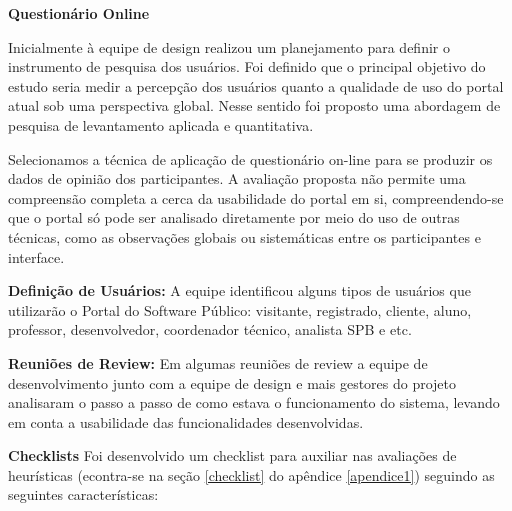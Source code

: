 \textbf{Questionário Online}

Inicialmente à equipe de design realizou um planejamento para definir o instrumento de pesquisa dos usuários. Foi definido que o principal objetivo do estudo seria medir a percepção dos usuários quanto a qualidade de uso do portal atual sob uma perspectiva global. Nesse sentido foi proposto uma abordagem de pesquisa de levantamento aplicada e quantitativa.

Selecionamos a técnica de aplicação de questionário on-line para se produzir os dados de opinião dos participantes. A avaliação proposta não permite uma compreensão completa a cerca da usabilidade do portal em si, compreendendo-se que o portal só pode ser analisado diretamente por meio do uso de outras técnicas, como as observações globais ou sistemáticas entre os participantes e interface.

\textbf{Definição de Usuários:}
	A equipe identificou alguns tipos de usuários que utilizarão o Portal do Software Público: visitante, registrado, cliente, aluno, professor, desenvolvedor, coordenador técnico, analista SPB e etc. 
	
\textbf{Reuniões de Review:}
	Em algumas reuniões de review a equipe de desenvolvimento junto com a equipe de design e mais gestores do projeto analisaram o passo a passo de como estava o funcionamento do sistema, levando em conta a usabilidade das funcionalidades desenvolvidas. 


\textbf{Checklists}
	Foi desenvolvido um checklist para auxiliar nas avaliações de heurísticas (econtra-se na seção \ref{checklist} do apêndice \ref{apendice1}) seguindo as seguintes características:

